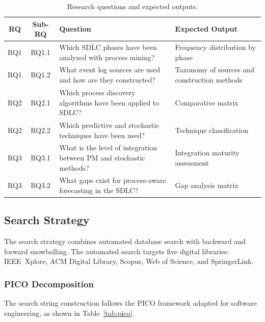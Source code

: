 \begin{table}[htbp]
\centering
\caption{Research questions and expected outputs.}
\label{tab:slr-rqs}
\small
\setlength{\tabcolsep}{4pt}
\begin{tabular}{c c p{7.1cm} p{3.8cm}}
\toprule
\textbf{RQ} & \textbf{Sub-RQ} & \textbf{Question} & \textbf{Expected Output} \\
\midrule
RQ1 & RQ1.1 & Which SDLC phases have been analyzed with process mining? &
  Frequency distribution by phase \\
RQ1 & RQ1.2 & What event log sources are used and how are they constructed? &
  Taxonomy of sources and construction methods \\
\midrule
RQ2 & RQ2.1 & Which process discovery algorithms have been applied to SDLC? &
  Comparative matrix \\
RQ2 & RQ2.2 & Which predictive and stochastic techniques have been used? &
  Technique classification \\
\midrule
RQ3 & RQ3.1 & What is the level of integration between PM and stochastic
  methods? & Integration maturity assessment \\
RQ3 & RQ3.2 & What gaps exist for process-aware forecasting in the SDLC? &
  Gap analysis matrix \\
\bottomrule
\end{tabular}
\end{table}


\subsection{Search Strategy}
\label{sec:slr-search}

The search strategy combines automated database search with backward and
forward snowballing. The automated search targets five digital libraries:
IEEE~Xplore, ACM Digital Library, Scopus, Web of Science, and SpringerLink.

\subsubsection{PICO Decomposition}

The search string construction follows the PICO framework adapted for
software engineering, as shown in Table~\ref{tab:pico}.

